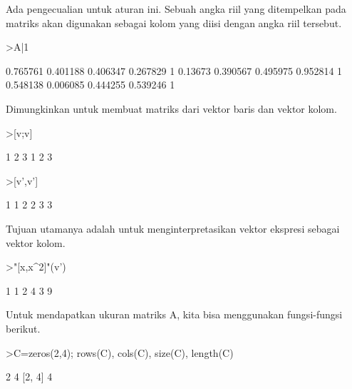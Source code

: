 \documentclass[a4paper,10pt]{article}
\begin{document}
\begin{eulernotebook}
\begin{eulercomment}
\begin{eulercomment}
\begin{eulercomment}
\begin{eulercomment}
\begin{eulercomment}
\begin{eulercomment}
\begin{eulercomment}
\begin{eulercomment}
\begin{eulercomment}
\begin{eulercomment}
\begin{eulercomment}
\begin{eulercomment}
\begin{eulercomment}
\begin{eulercomment}
\begin{eulercomment}
\begin{eulercomment}
\begin{eulercomment}
\begin{eulercomment}
\begin{eulercomment}
Ada pengecualian untuk aturan ini. Sebuah angka riil yang ditempelkan
pada matriks akan digunakan sebagai kolom yang diisi dengan angka riil
tersebut.
\end{eulercomment}
\begin{eulerprompt}
>A|1
\end{eulerprompt}
\begin{euleroutput}
       0.765761      0.401188      0.406347      0.267829             1 
        0.13673      0.390567      0.495975      0.952814             1 
       0.548138      0.006085      0.444255      0.539246             1 
\end{euleroutput}
\begin{eulercomment}
Dimungkinkan untuk membuat matriks dari vektor baris dan vektor kolom.
\end{eulercomment}
\begin{eulerprompt}
>[v;v]
\end{eulerprompt}
\begin{euleroutput}
              1             2             3 
              1             2             3 
\end{euleroutput}
\begin{eulerprompt}
>[v',v']
\end{eulerprompt}
\begin{euleroutput}
              1             1 
              2             2 
              3             3 
\end{euleroutput}
\begin{eulercomment}
Tujuan utamanya adalah untuk menginterpretasikan vektor ekspresi
sebagai vektor kolom.
\end{eulercomment}
\begin{eulerprompt}
>"[x,x^2]"(v')
\end{eulerprompt}
\begin{euleroutput}
              1             1 
              2             4 
              3             9 
\end{euleroutput}
\begin{eulercomment}
Untuk mendapatkan ukuran matriks A, kita bisa menggunakan
fungsi-fungsi berikut.
\end{eulercomment}
\begin{eulerprompt}
>C=zeros(2,4); rows(C), cols(C), size(C), length(C)
\end{eulerprompt}
\begin{euleroutput}
  2
  4
  [2,  4]
  4
\end{euleroutput}

\end{eulercomment}
\end{eulercomment}
\end{eulercomment}
\end{eulercomment}
\end{eulercomment}
\end{eulercomment}
\end{eulercomment}
\end{eulercomment}
\end{eulercomment}
\end{eulercomment}
\end{eulercomment}
\end{eulercomment}
\end{eulercomment}
\end{eulercomment}
\end{eulercomment}
\end{eulercomment}
\end{eulercomment}
\end{eulercomment}
\end{eulernotebook}
\end{document}

